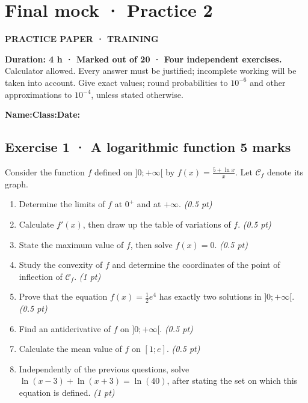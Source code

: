 \fi

\clearpage{}\label{sujet:9-2}

\section*{Final mock · Practice 2}

{\sffamily\bfseries\color{teal}PRACTICE PAPER · TRAINING\par}

\textbf{Duration: 4 h · Marked out of 20 · Four independent exercises.}\\Calculator allowed. Every answer must be justified; incomplete working will be taken into account. Give exact values; round probabilities to $10^{-6}$ and other approximations to $10^{-4}$, unless stated otherwise.

\smallskip\textbf{Name:}\enspace\dotfill\quad\textbf{Class:}\enspace\dotfill\quad\textbf{Date:}\enspace\dotfill

\subsection*{Exercise 1 · A logarithmic function \hfill 5 marks}Consider the function $f$ defined on $]0;+\infty[$ by $f(x)=\frac{5+\ln x}x$. Let $\mathcal C_f$ denote its graph.

\begin{enumerate}

\item Determine the limits of $f$ at $0^+$ and at $+\infty$. \hfill\textit{(0.5 pt)}

\item Calculate $f' (x)$, then draw up the table of variations of $f$. \hfill\textit{(0.5 pt)}

\item State the maximum value of $f$, then solve $f(x)=0$. \hfill\textit{(0.5 pt)}

\item Study the convexity of $f$ and determine the coordinates of the point of inflection of $\mathcal C_f$. \hfill\textit{(1 pt)}

\item Prove that the equation $f(x)=\frac12 e^{4}$ has exactly two solutions in $]0;+\infty[$. \hfill\textit{(0.5 pt)}

\item Find an antiderivative of $f$ on $]0;+\infty[$. \hfill\textit{(0.5 pt)}

\item Calculate the mean value of $f$ on $[1;e]$. \hfill\textit{(0.5 pt)}

\item Independently of the previous questions, solve $\ln(x-3)+\ln(x+3)=\ln(40)$, after stating the set on which this equation is defined. \hfill\textit{(1 pt)}

\end{enumerate}

